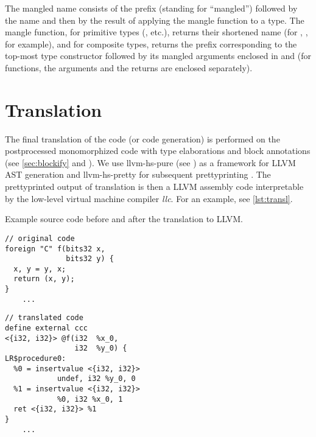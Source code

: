 \begin{defn}
    The mangled name consists of the  prefix (standing for ``mangled'') followed by the name and then by the result of applying the mangle function to a type. The mangle function, for primitive types (, etc.), returns their shortened name (for , , for example), and for composite types, returns the prefix corresponding to the top-most type constructor followed by its mangled arguments enclosed in  and  (for functions, the arguments and the returns are enclosed separately).
\end{defn}

\section{Translation}
\label{translation}

The final translation of the code (or code generation) is performed on the postprocessed monomorphized code with type elaborations and block annotations (see \cref{sec:blockify} and ). We use llvm-hs-pure (see \cite{llvmHSpure}) as a framework for LLVM AST generation and llvm-hs-pretty for subsequent prettyprinting \cite{llvmHSpretty}. The prettyprinted output of translation is then a LLVM assembly code interpretable by the low-level virtual machine compiler \emph{llc}. For an example, see \cref{lst:transl}.

\begin{listing}
    \caption{Example source code before and after the translation to LLVM.}
    \label{lst:transl}
    \begin{center}
    \begin{minipage}{0.5\linewidth}
    \begin{lstlisting}
// original code
foreign "C" f(bits32 x,
              bits32 y) {
  x, y = y, x;
  return (x, y);
}
    ...\end{lstlisting}
    \end{minipage}%
    \begin{minipage}{0.5\linewidth}
    \begin{lstlisting}
// translated code
define external ccc
<{i32, i32}> @f(i32  %x_0,
                i32  %y_0) {
LR$procedure0:
  %0 = insertvalue <{i32, i32}>
            undef, i32 %y_0, 0
  %1 = insertvalue <{i32, i32}>
            %0, i32 %x_0, 1
  ret <{i32, i32}> %1
}
    ...\end{lstlisting}
    \end{minipage}
    \end{center}
\end{listing}


